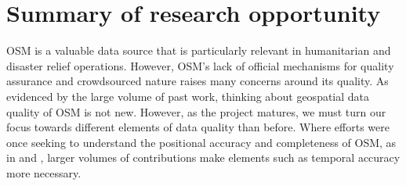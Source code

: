 \section{Summary of research opportunity}

OSM is a valuable data source that is particularly relevant in humanitarian and disaster relief operations. However, OSM’s lack of official mechanisms for quality assurance and crowdsourced nature raises many concerns around its quality. As evidenced by the large volume of past work, thinking about geospatial data quality of OSM is not new. However, as the project matures, we must turn our focus towards different elements of data quality than before. Where efforts were once seeking to understand the positional accuracy and completeness of OSM, as in \textcite{haklay_how_2010} and \textcite{girres_quality_2010}, larger volumes of contributions make elements such as temporal accuracy more necessary. 